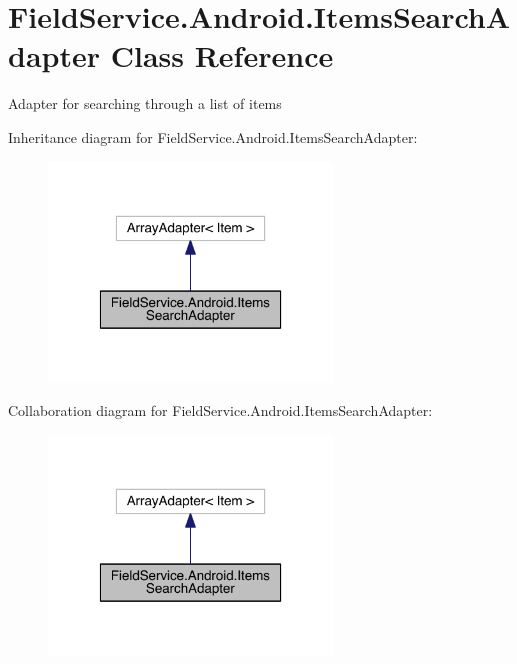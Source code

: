 \hypertarget{class_field_service_1_1_android_1_1_items_search_adapter}{\section{Field\+Service.\+Android.\+Items\+Search\+Adapter Class Reference}
\label{class_field_service_1_1_android_1_1_items_search_adapter}
}


Adapter for searching through a list of items  




Inheritance diagram for Field\+Service.\+Android.\+Items\+Search\+Adapter\+:
\nopagebreak
\begin{figure}[H]
\begin{center}
\leavevmode
\includegraphics[width=214pt]{class_field_service_1_1_android_1_1_items_search_adapter__inherit__graph}
\end{center}
\end{figure}


Collaboration diagram for Field\+Service.\+Android.\+Items\+Search\+Adapter\+:
\nopagebreak
\begin{figure}[H]
\begin{center}
\leavevmode
\includegraphics[width=214pt]{class_field_service_1_1_android_1_1_items_search_adapter__coll__graph}
\end{center}
\end{figure}
